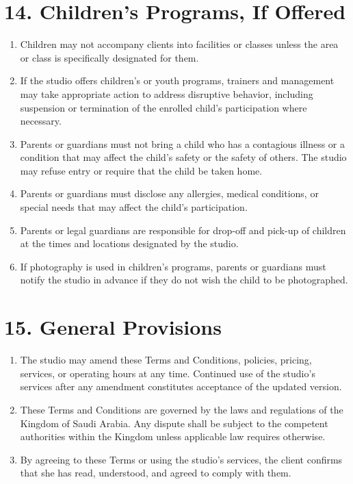 \documentclass[12pt,a4paper]{article}
\begin{document}
\section*{14. Children’s Programs, If Offered}
\begin{enumerate}
    \item Children may not accompany clients into facilities or classes unless the area or class is specifically designated for them.
    \item If the studio offers children’s or youth programs, trainers and management may take appropriate action to address disruptive behavior, including suspension or termination of the enrolled child’s participation where necessary.
    \item Parents or guardians must not bring a child who has a contagious illness or a condition that may affect the child’s safety or the safety of others. The studio may refuse entry or require that the child be taken home.
    \item Parents or guardians must disclose any allergies, medical conditions, or special needs that may affect the child’s participation.
    \item Parents or legal guardians are responsible for drop-off and pick-up of children at the times and locations designated by the studio.
    \item If photography is used in children’s programs, parents or guardians must notify the studio in advance if they do not wish the child to be photographed.
\end{enumerate}

\section*{15. General Provisions}
\begin{enumerate}
    \item The studio may amend these Terms and Conditions, policies, pricing, services, or operating hours at any time. Continued use of the studio’s services after any amendment constitutes acceptance of the updated version.
    \item These Terms and Conditions are governed by the laws and regulations of the Kingdom of Saudi Arabia. Any dispute shall be subject to the competent authorities within the Kingdom unless applicable law requires otherwise.
    \item By agreeing to these Terms or using the studio’s services, the client confirms that she has read, understood, and agreed to comply with them.
\end{enumerate}
\end{document}

